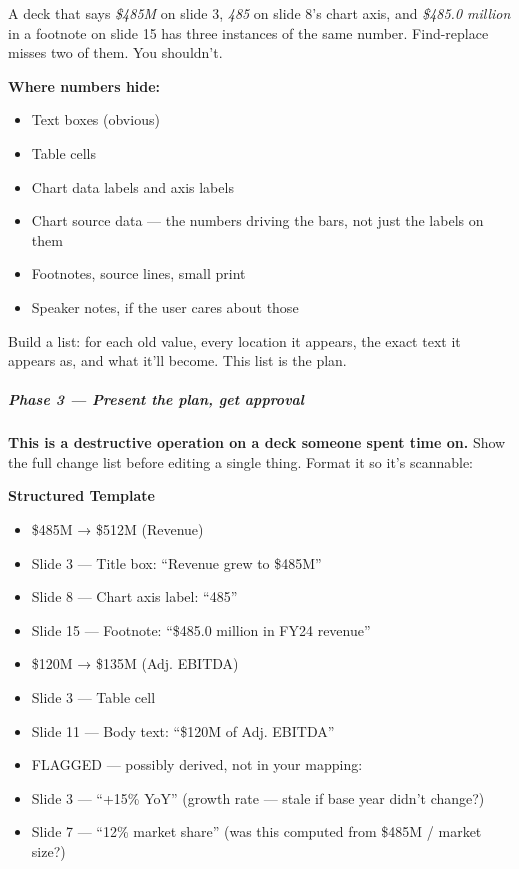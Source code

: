 \documentclass[11pt]{article}
\begin{document}
A deck that says \emph{\$485M} on slide 3, \emph{485} on slide 8's chart axis, and \emph{\$485.0 million} in a footnote on slide 15 has three instances of the same number. Find-replace misses two of them. You shouldn't.


\textbf{Where numbers hide:}

\begin{itemize}[leftmargin=*,itemsep=2pt,topsep=2pt]
\item {} Text boxes (obvious)
\item {} Table cells
\item {} Chart data labels and axis labels
\item {} Chart source data — the numbers driving the bars, not just the labels on them
\item {} Footnotes, source lines, small print
\item {} Speaker notes, if the user cares about those
\end{itemize}

Build a list: for each old value, every location it appears, the exact text it appears as, and what it'll become. This list is the plan.


\subparagraph{Phase 3 — Present the plan, get approval}\mbox{}\par

\textbf{This is a destructive operation on a deck someone spent time on.} Show the full change list before editing a single thing. Format it so it's scannable:


\textbf{Structured Template}
\begin{itemize}[leftmargin=*,itemsep=2pt,topsep=2pt]
\item {} \$485M → \$512M (Revenue)
\item {} Slide 3 — Title box: ``Revenue grew to \$485M''
\item {} Slide 8 — Chart axis label: ``485''
\item {} Slide 15 — Footnote: ``\$485.0 million in FY24 revenue''
\item {} \$120M → \$135M (Adj. EBITDA)
\item {} Slide 3 — Table cell
\item {} Slide 11 — Body text: ``\$120M of Adj. EBITDA''
\item {} FLAGGED — possibly derived, not in your mapping:
\item {} Slide 3 — ``+15\% YoY'' (growth rate — stale if base year didn't change?)
\item {} Slide 7 — ``12\% market share'' (was this computed from \$485M / market size?)
\end{itemize}
\end{document}
